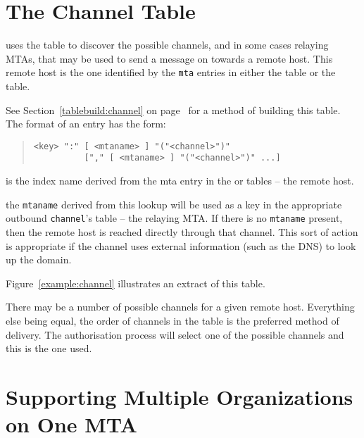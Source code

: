 \section {The Channel Table}

 uses the  table to discover the
possible channels, and in some cases relaying MTAs, that may be used
to send a message on towards a remote host.
This remote host is the one identified by the \verb|mta| entries in
either the  table or the  table.

See Section~\ref{tablebuild:channel} on
page~\pageref{tablebuild:channel} for a method of building this table.
The format of an entry has the form:

\begin{quote}\begin{verbatim}
<key> ":" [ <mtaname> ] "("<channel>")" 
          ["," [ <mtaname> ] "("<channel>")" ...] 
\end{verbatim}\end{quote}

\begin{describe}
\item[\verb+key+:] is the index
name derived from the mta entry in the  or 
tables -- the remote host.

\item[\verb+mtaname+/\verb+channel+:] the \verb+mtaname+ derived from
this lookup will be used as a key in the appropriate outbound
\verb+channel+'s table -- the relaying MTA.  If there is no
\verb|mtaname| present, then 
the remote host is reached directly through that channel. This sort of
action is appropriate if the channel uses external information (such
as the DNS) to look up the domain.
\end{describe}

Figure~\ref{example:channel} illustrates an extract of this table.

There may be a number of possible channels for a given remote host.
Everything else being equal, the order of channels in the table is the
preferred method of delivery.
The authorisation process will select one of the possible channels and
this is the one used.



\section{Supporting Multiple Organizations on One MTA} \label{sect:multihub}

